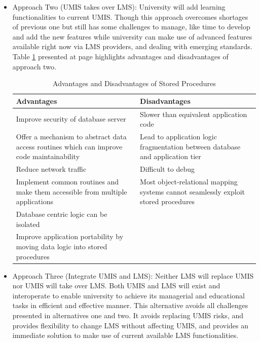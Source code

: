 \documentclass[12pt,a4paper,final,twoside,onecolumn,titlepage]{book}
\begin{document}
\begin{itemize}
\item Approach Two (\gls{UMIS} takes over \gls{LMS}): University will add learning functionalities to current \gls{UMIS}. Though this approach overcomes shortages of previous one but still has some challenges to manage, like time to develop and add the new features while university can make use of advanced features available right now via \gls{LMS} providers, and dealing with emerging standards. Table \ref{App2} presented at page \pageref{App2} highlights advantages and disadvantages of approach two.

\begin{table}
\begin{center}
\caption{Advantages and Disadvantages of Stored Procedures}
\begin{tabularx}{\textwidth}{|X|X|}
\hline Advantages & Disadvantages \\
\hline Improve security of database server	& Slower than equivalent application code\\
\hline Offer a mechanism to abstract data access routines which can improve code maintainability	& Lead to application logic fragmentation between database and application tier\\
\hline Reduce network traffic	& Difficult to debug\\
\hline Implement common routines and make them accessible from multiple applications	& Most object-relational mapping systems cannot seamlessly exploit stored procedures\\
\hline Database centric logic can be isolated	& \\
\hline Improve application portability by moving data logic into stored procedures	& \\
\hline
\end{tabularx}
\end{center}
\label{App2}
\end{table}


\item Approach Three (Integrate \gls{UMIS} and \gls{LMS}): Neither \gls{LMS} will replace \gls{UMIS} nor \gls{UMIS} will take over \gls{LMS}. Both \gls{UMIS} and \gls{LMS} will exist and interoperate to enable university to achieve its managerial and educational tasks in efficient and effective manner. This alternative avoids all challenges presented in alternatives one and two. It avoids replacing \gls{UMIS} risks, and provides flexibility to change \gls{LMS} without affecting \gls{UMIS}, and provides an immediate solution to make use of current available \gls{LMS} functionalities.
\end{itemize}
\end{document}
